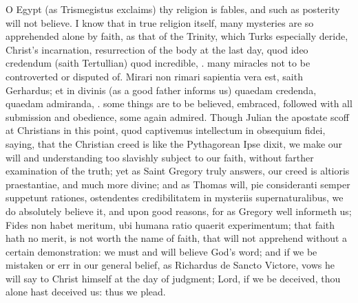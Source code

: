 {O Egypt (as Trismegistus exclaims) thy religion is fables, and
such as posterity will not believe. I know that in true religion
itself, many mysteries are so apprehended alone by faith, as that of
the Trinity, which Turks especially deride, Christ's incarnation,
resurrection of the body at the last day, quod ideo credendum (saith
Tertullian) quod incredible, \etc{}. many miracles not to be controverted
or disputed of. Mirari non rimari sapientia vera est, saith
Gerhardus; et in divinis (as a good father informs us) quaedam
credenda, quaedam admiranda, \etc{}. some things are to be believed,
embraced, followed with all submission and obedience, some again
admired. Though Julian the apostate scoff at Christians in this point,
quod captivemus intellectum in obsequium fidei, saying, that the
Christian creed is like the Pythagorean Ipse dixit, we make our will
and understanding too slavishly subject to our faith, without farther
examination of the truth; yet as Saint Gregory truly answers, our creed
is altioris praestantiae, and much more divine; and as Thomas will, pie
consideranti semper suppetunt rationes, ostendentes credibilitatem in
mysteriis supernaturalibus, we do absolutely believe it, and upon good
reasons, for as Gregory well informeth us; Fides non habet meritum, ubi
humana ratio quaerit experimentum; that faith hath no merit, is not
worth the name of faith, that will not apprehend without a certain
demonstration: we must and will believe God's word; and if we be
mistaken or err in our general belief, as Richardus de Sancto
Victore, vows he will say to Christ himself at the day of judgment;
Lord, if we be deceived, thou alone hast deceived us: thus we plead.

}
